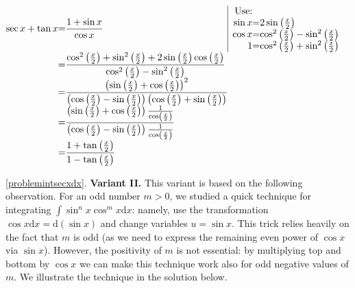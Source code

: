 {$\begin{array}{@{}r@{}c@{}l@{}l@{}|l}
\displaystyle \sec x+\tan x &=&\displaystyle  \frac{1+\sin x}{\cos x}&&\begin{array}{@{}r@{}c@{}l}\text{Use:}\\
\sin x &=& 2\sin \left(\frac{x}{2}\right)\\ \cos x&=& \cos^2 \left(\frac{x}{2}\right) -\sin^2 \left(\frac{x}{2}\right)\\ 1&=&\cos^2 \left(\frac{x}{2}\right)+ \sin^2 \left(\frac{x}{2}\right) \end{array}\\
&=&\displaystyle  \frac{\cos^2\left(\frac{x}{2}\right)+ \sin^2\left(\frac{x}{2}\right)+2\sin \left(\frac{x}{2}\right) \cos \left(\frac{x}{2}\right)}{\cos^2 \left(\frac{x}{2}\right) -\sin^2\left(\frac{x}{2}\right)}\\
&=&\displaystyle \frac{\left(\sin \left(\frac{x}{2}\right)+ \cos\left( \frac{ x}{ 2}\right) \right)^{2}}{ {\left(\cos \left( \frac{ x}{ 2} \right)-\sin \left( \frac{x }{2}\right)\right)} \left(\cos  \left(\frac{x}{2}\right)+\sin \left(\frac{x}{2}\right)\right)}\\
&=&\displaystyle \frac{\left(\sin \left(\frac{x}{2}\right)+ \cos\left( \frac{ x}{ 2}\right) \right)\frac{1}{\cos  \left(\frac{x}{2}\right) } }{ \left(\cos  \left(\frac{x}{2}\right)- \sin \left( \frac{ x}{2} \right)\right)\frac{1}{\cos\left(\frac{x}{2}\right)}}\\
&=&\displaystyle \frac{1+\tan \left(\frac{x}{2} \right)}{1 -\tan\left( \frac{ x}{2} \right)}
\end{array}
$

\ref{problemintsecxdx}. \textbf{Variant II.} This variant is based on the following observation. For an odd number $m>0 $, we studied a quick technique for integrating $\int \sin^n x \cos^m x \text{d} x $: namely, use the transformation $\cos x \text{d} x = \text{d} (\sin x)$ and change variables $u=\sin x $. This trick relies heavily on the fact that $m$ is odd (as we need to express the remaining even power of $\cos x$ via $\sin x$). However, the positivity of $m$ is not essential: by multiplying top and bottom by $\cos x$ we can make this technique work also for odd negative values of $m$. We illustrate the technique in the solution below.

}
